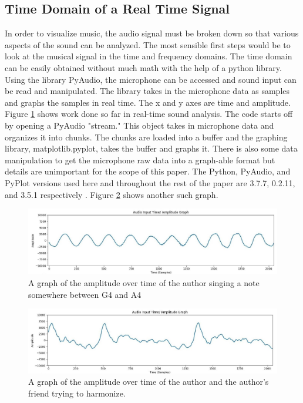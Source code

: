 \documentclass[10pt]{article}
\begin{document}
\subsection{Time Domain of a Real Time Signal}
\hspace{\parindent} In order to visualize music, the audio signal must be broken down so that various aspects of the sound can be analyzed. The most sensible first steps would be to look at the musical signal in the time and frequency domains. The time domain can be easily obtained without much math with the help of a python library. Using the library PyAudio, the microphone can be accessed and sound input can be read and manipulated. The library takes in the microphone data as samples and graphs the samples in real time. The x and y axes are time and amplitude. Figure \ref{fig:time_1} shows work done so far in real-time sound analysis. The code starts off by opening a PyAudio "stream." This object takes in microphone data and organizes it into chunks. The chunks are loaded into a buffer and the graphing library, matplotlib.pyplot, takes the buffer and graphs it. There is also some data manipulation to get the microphone raw data into a graph-able format but details are unimportant for the scope of this paper. The Python, PyAudio, and PyPlot versions used here and throughout the rest of the paper are 3.7.7, 0.2.11, and 3.5.1 respectively \cite{hunter2007pyplot} \cite{pyaudio} \cite{python}. Figure \ref{fig:time_2} shows another such graph.

\begin{figure}[H]
    \centering
    \includegraphics[width=1.05\textwidth]{Alan_1}
    \caption{A graph of the amplitude over time of the author singing a note somewhere between G4 and A4 \cite{noteFrequencies}}
    \label{fig:time_1}
\end{figure}

\begin{figure}[H]
    \centering
    \includegraphics[width=1.05\textwidth]{Matt_1}
    \caption{A graph of the amplitude over time of the author and the author's friend trying to harmonize.}
    \label{fig:time_2}
\end{figure}
\end{document}
